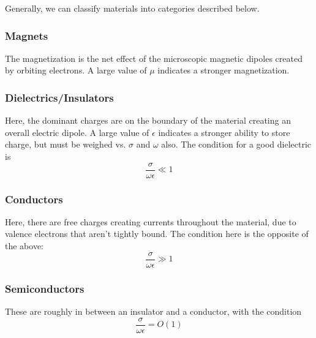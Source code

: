 \documentclass{article}
\begin{document}
Generally, we can classify materials into categories described below.

\subsubsection{Magnets} The magnetization is the net effect of the microscopic magnetic dipoles created by orbiting electrons. A large value of $\mu$ indicates a stronger magnetization.
\subsubsection{Dielectrics/Insulators}
Here, the dominant charges are on the boundary of the material creating an overall electric dipole. A large value of $\epsilon$ indicates a stronger ability to store charge, but must be weighed vs. $\sigma$ and $\omega$ also. The condition for a good dielectric is
    \begin{equation} \label{eq:dielectric}
        \frac{\sigma}{\omega \epsilon} \ll 1
    \end{equation}
\subsubsection{Conductors}
Here, there are free charges creating currents throughout the material, due to valence electrons that aren't tightly bound. The condition here is the opposite of the above:
    \begin{equation} \label{eq:conductor}
        \frac{\sigma}{\omega \epsilon} \gg 1
    \end{equation}
\subsubsection{Semiconductors}
These are roughly in between an insulator and a conductor, with the condition
    \begin{equation} \label{eq:semiconductor}
        \frac{\sigma}{\omega \epsilon} = O(1)
    \end{equation}
\newpage
\end{document}
